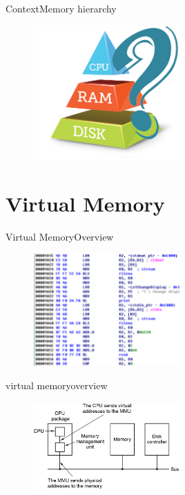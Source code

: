 \documentclass[10pt]{beamer}
\begin{document}
\begin{frame}{Context}{Memory hierarchy}
  \begin{figure}[ht]
    \centering
    \includegraphics[width=0.5\textwidth, keepaspectratio=true]{images/memory_hierarchy_why.png}
  \end{figure}
\end{frame}

\section{Virtual Memory}
\begin{frame}{Virtual Memory}{Overview}
  \begin{figure}[ht]
    \centering
    \includegraphics[width=0.5\textwidth, keepaspectratio=true]{images/assembly_code_load_from_memory.png}
  \end{figure}
\end{frame}

\begin{frame}{virtual memory}{overview}
  \begin{figure}[ht]
    \centering
    \includegraphics[width=0.5\textwidth, keepaspectratio=true]{images/mmu_cpu.png}
  \end{figure}
\end{frame}
\end{document}
